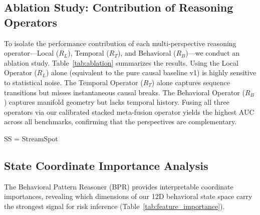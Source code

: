 \subsection{Ablation Study: Contribution of Reasoning Operators}
To isolate the performance contribution of each multi-perspective reasoning operator—Local ($R_L$), Temporal ($R_T$), and Behavioral ($R_B$)—we conduct an ablation study. Table~\ref{tab:ablation} summarizes the results.
Using the Local Operator ($R_L$) alone (equivalent to the pure causal baseline v1) is highly sensitive to statistical noise. The Temporal Operator ($R_T$) alone captures sequence transitions but misses instantaneous causal breaks. The Behavioral Operator ($R_B$) captures manifold geometry but lacks temporal history. Fusing all three operators via our calibrated stacked meta-fusion operator yields the highest AUC across all benchmarks, confirming that the perspectives are complementary.

\begin{table}[htbp]
\centering
\caption{Ablation study (AUC-ROC): contribution of each reasoning operator.}
\newline\vspace{1pt}
\footnotesize{SS = StreamSpot}
\label{tab:ablation}
\end{table}

\subsection{State Coordinate Importance Analysis}
The Behavioral Pattern Reasoner (BPR) provides interpretable coordinate importances, revealing which dimensions of our 12D behavioral state space carry the strongest signal for risk inference (Table~\ref{tab:feature_importance}).

